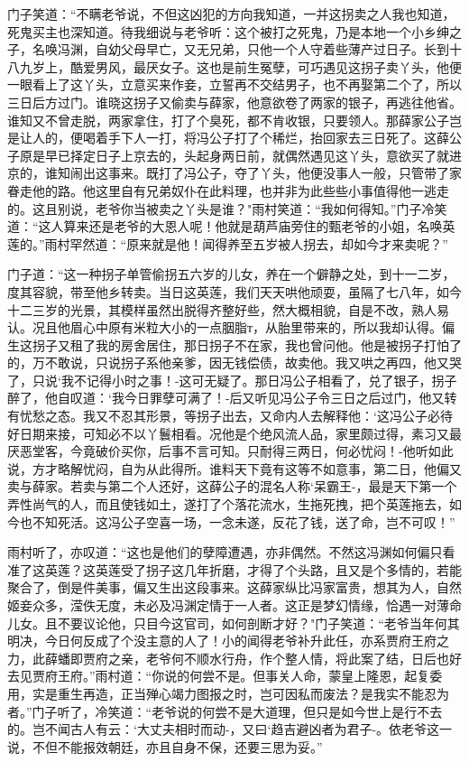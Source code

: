 门子笑道：“不瞒老爷说，不但这凶犯的方向我知道，一并这拐卖之人我也知道，死鬼买主也深知道。待我细说与老爷听：这个被打之死鬼，乃是本地一个小乡绅之子，名唤冯渊，自幼父母早亡，又无兄弟，只他一个人守着些薄产过日子。长到十八九岁上，酷爱男风，最厌女子。这也是前生冤孽，可巧遇见这拐子卖丫头，他便一眼看上了这丫头，立意买来作妾，立誓再不交结男子，也不再娶第二个了，所以三日后方过门。谁晓这拐子又偷卖与薛家，他意欲卷了两家的银子，再逃往他省。谁知又不曾走脱，两家拿住，打了个臭死，都不肯收银，只要领人。那薛家公子岂是让人的，便喝着手下人一打，将冯公子打了个稀烂，抬回家去三日死了。这薛公子原是早已择定日子上京去的，头起身两日前，就偶然遇见这丫头，意欲买了就进京的，谁知闹出这事来。既打了冯公子，夺了丫头，他便没事人一般，只管带了家眷走他的路。他这里自有兄弟奴仆在此料理，也并非为此些些小事值得他一逃走的。这且别说，老爷你当被卖之丫头是谁？"雨村笑道：“我如何得知。”门子冷笑道：“这人算来还是老爷的大恩人呢！他就是葫芦庙旁住的甄老爷的小姐，名唤英莲的。”雨村罕然道：“原来就是他！闻得养至五岁被人拐去，却如今才来卖呢？”

门子道：“这一种拐子单管偷拐五六岁的儿女，养在一个僻静之处，到十一二岁，度其容貌，带至他乡转卖。当日这英莲，我们天天哄他顽耍，虽隔了七八年，如今十二三岁的光景，其模样虽然出脱得齐整好些，然大概相貌，自是不改，熟人易认。况且他眉心中原有米粒大小的一点胭脂т，从胎里带来的，所以我却认得。偏生这拐子又租了我的房舍居住，那日拐子不在家，我也曾问他。他是被拐子打怕了的，万不敢说，只说拐子系他亲爹，因无钱偿债，故卖他。我又哄之再四，他又哭了，只说`我不记得小时之事！-这可无疑了。那日冯公子相看了，兑了银子，拐子醉了，他自叹道：`我今日罪孽可满了！-后又听见冯公子令三日之后过门，他又转有忧愁之态。我又不忍其形景，等拐子出去，又命内人去解释他：`这冯公子必待好日期来接，可知必不以丫鬟相看。况他是个绝风流人品，家里颇过得，素习又最厌恶堂客，今竟破价买你，后事不言可知。只耐得三两日，何必忧闷！-他听如此说，方才略解忧闷，自为从此得所。谁料天下竟有这等不如意事，第二日，他偏又卖与薛家。若卖与第二个人还好，这薛公子的混名人称`呆霸王-，最是天下第一个弄性尚气的人，而且使钱如土，遂打了个落花流水，生拖死拽，把个英莲拖去，如今也不知死活。这冯公子空喜一场，一念未遂，反花了钱，送了命，岂不可叹！”

雨村听了，亦叹道：“这也是他们的孽障遭遇，亦非偶然。不然这冯渊如何偏只看准了这英莲？这英莲受了拐子这几年折磨，才得了个头路，且又是个多情的，若能聚合了，倒是件美事，偏又生出这段事来。这薛家纵比冯家富贵，想其为人，自然姬妾众多，滢佚无度，未必及冯渊定情于一人者。这正是梦幻情缘，恰遇一对薄命儿女。且不要议论他，只目今这官司，如何剖断才好？"门子笑道：“老爷当年何其明决，今日何反成了个没主意的人了！小的闻得老爷补升此任，亦系贾府王府之力，此薛蟠即贾府之亲，老爷何不顺水行舟，作个整人情，将此案了结，日后也好去见贾府王府。”雨村道：“你说的何尝不是。但事关人命，蒙皇上隆恩，起复委用，实是重生再造，正当殚心竭力图报之时，岂可因私而废法？是我实不能忍为者。”门子听了，冷笑道：“老爷说的何尝不是大道理，但只是如今世上是行不去的。岂不闻古人有云：`大丈夫相时而动-，又曰`趋吉避凶者为君子-。依老爷这一说，不但不能报效朝廷，亦且自身不保，还要三思为妥。”

